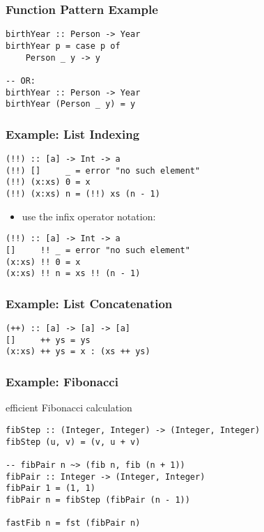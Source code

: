 \documentclass[dvipsnames]{beamer}
\theoremstyle{plain}
\begin{document}
\begin{frame}[fragile]
  \frametitle{Function Pattern Example}

  \begin{lstlisting}
birthYear :: Person -> Year
birthYear p = case p of
    Person _ y -> y

-- OR:
birthYear :: Person -> Year
birthYear (Person _ y) = y
  \end{lstlisting}
\end{frame}

\begin{frame}[fragile]
  \frametitle{Example: List Indexing}

  \begin{lstlisting}
(!!) :: [a] -> Int -> a
(!!) []     _ = error "no such element"
(!!) (x:xs) 0 = x
(!!) (x:xs) n = (!!) xs (n - 1)
  \end{lstlisting}

  \pause
  \begin{itemize}
    \item use the infix operator notation:
  \end{itemize}

  \begin{lstlisting}
(!!) :: [a] -> Int -> a
[]     !! _ = error "no such element"
(x:xs) !! 0 = x
(x:xs) !! n = xs !! (n - 1)
    \end{lstlisting}
\end{frame}

\begin{frame}[fragile]
  \frametitle{Example: List Concatenation}

  \begin{lstlisting}
(++) :: [a] -> [a] -> [a]
[]     ++ ys = ys
(x:xs) ++ ys = x : (xs ++ ys)
  \end{lstlisting}
\end{frame}

\begin{frame}[fragile]
  \frametitle{Example: Fibonacci}

  \begin{exampleblock}{efficient Fibonacci calculation}
    \begin{lstlisting}
fibStep :: (Integer, Integer) -> (Integer, Integer)
fibStep (u, v) = (v, u + v)

-- fibPair n ~> (fib n, fib (n + 1))
fibPair :: Integer -> (Integer, Integer)
fibPair 1 = (1, 1)
fibPair n = fibStep (fibPair (n - 1))

fastFib n = fst (fibPair n)
    \end{lstlisting}
  \end{exampleblock}
\end{frame}
\end{document}
